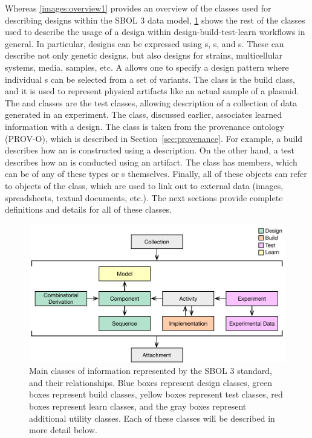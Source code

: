 Whereas \ref{images:overview1} provides an overview of the classes used for describing designs within the SBOL 3 data model,  \ref{images:overview2} shows the rest of the classes used to describe the usage of a design within design-build-test-learn workflows in general.
In particular, designs can be expressed using s, s, and s.
These can describe not only genetic designs, but also designs for strains, multicellular systems, media, samples, etc.
A  allows one to specify a design pattern where individual s can be selected from a set of variants.  
The  class is the build class, and it is used to represent physical artifacts like an actual sample of a plasmid.  
The  and  classes are the test classes, allowing description of a collection of data generated in an experiment.  
The  class, discussed earlier, associates learned information with a design.
The \activity class is taken from the provenance ontology (PROV-O), which is described in Section~\ref{sec:provenance}.  For example, a build \activity describes how an  is constructed using a  description.  On the other hand, a test \activity describes how an  is conducted using an  artifact.  The  class has members, which can be of any of these types or s themselves.  
Finally, all of these objects can refer to objects of the  class, which are used to link out to external data (images, spreadsheets, textual documents, etc.). 
The next sections provide complete definitions and details for all of these classes.

\begin{figure}[ht]
\begin{center}
\includegraphics[scale=0.85]{images/SBOL3-top-levels.pdf}
\caption{Main classes of information represented by the SBOL 3 standard, and their relationships.  Blue boxes represent design classes, green boxes represent build classes, yellow boxes represent test classes, red boxes represent learn classes, and the gray boxes represent additional utility classes.  Each of these classes will be described in more detail below.}
\label{images:overview2}
\end{center}
\end{figure}
